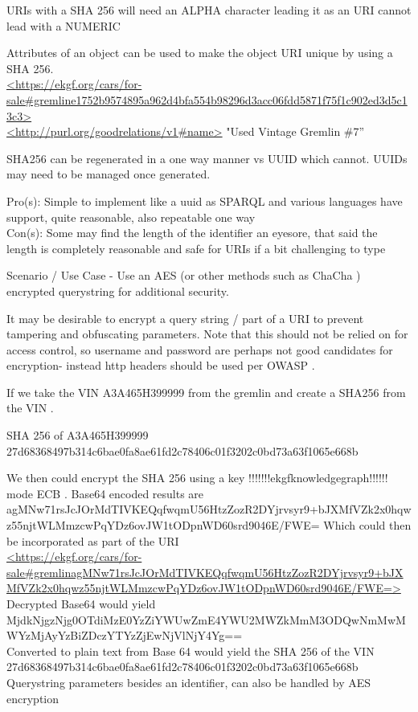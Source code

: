 URIs with a SHA 256 will need an ALPHA character leading it as an URI cannot lead with a NUMERIC

Attributes of an object can be used to make the object URI unique  by using a SHA 256. \\
    {\footnotesize\url{<https://ekgf.org/cars/for-sale#gremline1752b9574895a962d4bfa554b98296d3acc06fdd5871f75f1c902ed3d5c13c3>}  \\ \url{<http://purl.org/goodrelations/v1#name>} "Used Vintage Gremlin \#7”}

SHA256 can be regenerated in a one way manner vs UUID which cannot.
UUIDs may need to  be managed once generated.

Pro(s): Simple to implement like a uuid as SPARQL and various languages have support, quite reasonable, also
repeatable one way \\
Con(s): Some may find the length of the identifier an eyesore, that said the length is completely reasonable and safe
for URIs if a bit challenging to type


Scenario / Use Case -
Use an AES (or other methods such as ChaCha ) encrypted querystring for additional security.

It may be desirable to encrypt a query string / part of a URI to prevent tampering and obfuscating parameters.
Note that this should not be relied on for access control, so username and password are perhaps not good candidates
for encryption- instead http headers should be used per OWASP .

If we take the VIN A3A465H399999 from the gremlin and create a SHA256 from the VIN .

SHA 256 of A3A465H399999 \\

{\footnotesize 27d68368497b314c6bae0fa8ae61fd2c78406c01f3202c0bd73a63f1065e668b }

We then could encrypt the SHA 256 using a key !!!!!!!ekgfknowledgegraph!!!!!! mode ECB .
Base64 encoded results are \\
{\footnotesize agMNw71rsJcJOrMdTIVKEQqfwqmU56HtzZozR2DYjrvsyr9+bJXMfVZk2x0hqwz55njtWLMmzcwPqYDz6ovJW1tODpnWD60srd9046E/FWE=}
Which could then be incorporated as part of the URI \\
    {\scriptsize\url{<https://ekgf.org/cars/for-sale#gremlinagMNw71rsJcJOrMdTIVKEQqfwqmU56HtzZozR2DYjrvsyr9+bJXMfVZk2x0hqwz55njtWLMmzcwPqYDz6ovJW1tODpnWD60srd9046E/FWE=>}} \\
Decrypted Base64 would yield \\
{\scriptsize MjdkNjgzNjg0OTdiMzE0YzZiYWUwZmE4YWU2MWZkMmM3ODQwNmMwMWYzMjAyYzBiZDczYTYzZjEwNjVlNjY4Yg== } \\
Converted to plain text from Base 64 would yield the SHA 256 of the VIN \\
27d68368497b314c6bae0fa8ae61fd2c78406c01f3202c0bd73a63f1065e668b \\
Querystring parameters besides an identifier, can also be handled by AES encryption

